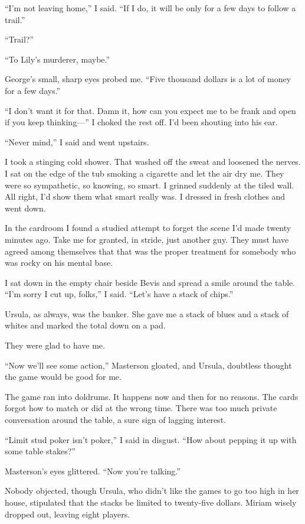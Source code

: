 \documentclass{novel}
\begin{document}
“I’m not leaving home,” I said. “If I do, it will be only for a few days to follow a trail.”

“Trail?”

“To Lily’s murderer, maybe.”

George’s small, sharp eyes probed me. “Five thousand dollars is a lot of money for a few days.”

“I don’t want it for that. Damn it, how can you expect me to be frank and open if you keep thinking—” I choked the rest off. I’d been shouting into his ear.

“Never mind,” I said and went upstairs.

I took a stinging cold shower. That washed off the sweat and loosened the nerves. I sat on the edge of the tub smoking a cigarette and let the air dry me. They were so sympathetic, so knowing, so smart. I grinned suddenly at the tiled wall. All right, I’d show them what smart really was. I dressed in fresh clothes and went down.

In the cardroom I found a studied attempt to forget the scene I’d made twenty minutes ago. Take me for granted, in stride, just another guy. They must have agreed among themselves that that was the proper treatment for somebody who was rocky on his mental base.

I sat down in the empty chair beside Bevis and spread a smile around the table. “I’m sorry I cut up, folks,” I said. “Let’s have a stack of chips.”

Ursula, as always, was the banker. She gave me a stack of blues and a stack of whites and marked the total down on a pad.

They were glad to have me. 

“Now we’ll see some action,” Masterson gloated, and Ursula, doubtless thought the game would be good for me.

The game ran into doldrums. It happens now and then for no reasons. The cards forgot how to match or did at the wrong time. There was too much private conversation around the table, a sure sign of lagging interest.

“Limit stud poker isn’t poker,” I said in disgust. “How about pepping it up with some table stakes?”

Masterson’s eyes glittered. “Now you’re talking.”

Nobody objected, though Ursula, who didn’t like the games to go too high in her house, stipulated that the stacks be limited to twenty-five dollars. Miriam wisely dropped out, leaving eight players.
\end{document}

